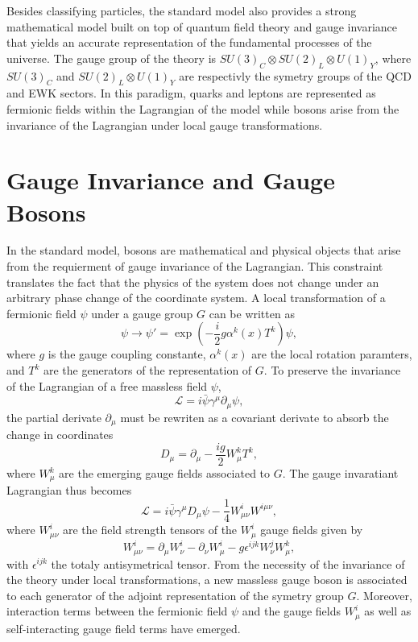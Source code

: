   Besides classifying particles, the standard model also provides a strong mathematical model built on top of quantum field theory and gauge invariance that yields an accurate representation of the fundamental processes of the universe. The gauge group of the theory is $ SU(3)_C \otimes SU(2)_L \otimes U(1)_Y $, where $ SU(3)_C $ and $ SU(2)_L \otimes U(1)_Y $ are respectivly the symetry groups of the QCD and EWK sectors. In this paradigm, quarks and leptons are represented as fermionic fields within the Lagrangian of the model while bosons arise from the invariance of the Lagrangian under local gauge transformations. \\

  \section{Gauge Invariance and Gauge Bosons}

    In the standard model, bosons are mathematical and physical objects that arise from the requierment of gauge invariance of the Lagrangian. This constraint translates the fact that the physics of the system does not change under an arbitrary phase change of the coordinate system. A local transformation of a fermionic field $ \psi $ under a gauge group $ G $  can be written as
    \begin{equation}
      \psi \rightarrow \psi' = \exp\left(- \frac{i}{2} g \alpha^k(x) T^k \right) \psi ,
    \end{equation}
    where $ g $ is the gauge coupling constante, $ \alpha^k(x) $ are the local rotation paramters, and $ T^k $ are the generators of the representation of $ G $. To preserve the invariance of the Lagrangian of a free massless field $ \psi $,
    \begin{equation}
      \mathcal{L} = i \bar{\psi} \gamma^\mu \partial_\mu \psi ,
    \end{equation}
    the partial derivate $ \partial_\mu $ must be rewriten as a covariant derivate to absorb the change in coordinates
    \begin{equation}
      D_\mu = \partial_\mu - \frac{i g}{2} W^k_\mu T^k ,
    \end{equation}
    where $ W^k_\mu $ are the emerging gauge fields associated to $ G $. The gauge invaratiant Lagrangian thus becomes
    \begin{equation}
      \mathcal{L} = i \bar{\psi} \gamma^\mu D_\mu \psi - \frac{1}{4} W^i_{\mu \nu} W^{i \mu \nu} ,
    \end{equation}
    where $ W^i_{\mu \nu} $ are the field strength tensors of the $ W^i_\mu $ gauge fields given by
    \begin{equation}
      W^i_{\mu \nu} = \partial_\mu W^i_\nu - \partial_\nu W^i_\mu - g \epsilon^{ijk} W^j_\nu W^k_\mu ,
    \end{equation}
    with $ \epsilon^{ijk} $ the totaly antisymetrical tensor. From the necessity of the invariance of the theory under local transformations, a new massless gauge boson is associated to each generator of the adjoint representation of the symetry group $ G $. Moreover, interaction terms between the fermionic field $ \psi $ and the gauge fields $ W^i_\mu $ as well as self-interacting gauge field terms have emerged.

